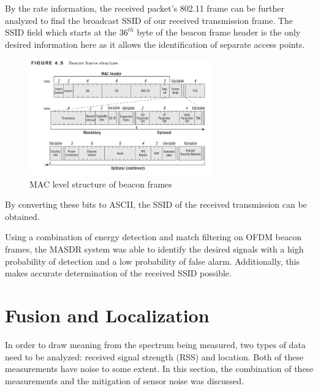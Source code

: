 By the rate information, the received packet's 802.11 frame can be further analyzed to find the broadcast SSID of our received transmission frame. The SSID field which starts at the $36^{th}$ byte of the beacon frame header is the only desired information here as it allows the identification of separate access points.
\begin{figure}[ht!]
	\centering
	\includegraphics[width=0.70\textwidth]{img/beacon_frame}
	\caption{MAC level structure of beacon frames\cite{beacon_frame}}
	\label{fig:beacon_frame}
\end{figure}\par
By converting these bits to ASCII, the SSID of the received transmission can be obtained. \par

Using a combination of energy detection and match filtering on OFDM beacon frames, the MASDR system was able to identify the desired signals with a high probability of detection and a low probability of false alarm. Additionally, this makes accurate determination of the received SSID possible.

\section{Fusion and Localization} \label{methods:kf}
In order to draw meaning from the spectrum being measured, two types of data need to be analyzed: received signal strength (RSS) and location. Both of these measurements have noise to some extent. In this section, the combination of these measurements and the mitigation of sensor noise was discussed. \par  


